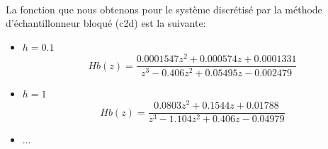 \paragraph{}
La fonction que nous obtenons pour le système discrétisé par la méthode d'échantillonneur bloqué (c2d) est la suivante:
\begin{itemize}[label=$\cdot$, itemsep=1em]
\item $h=0.1$
\begin{equation}
Hb(z) = \frac{0.0001547 z^{2} + 0.000574z + 0.0001331}{z^{3} - 0.406 z^{2} + 0.05495z - 0.002479}
\end{equation}

\item $h=1$
\begin{equation}
Hb(z) = \frac{0.0803 z^{2} + 0.1544z + 0.01788}{z^{3} - 1.104 z^{2} + 0.406z - 0.04979}
\end{equation}

\item ...
\end{itemize}

